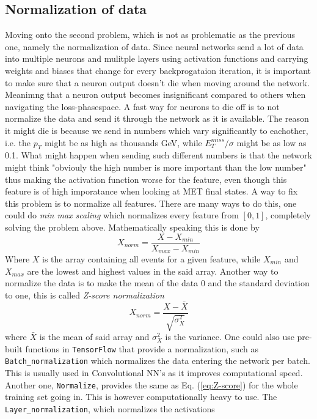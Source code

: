 \documentclass[12pt, a4paper]{book}
\begin{document}
\subsection{Normalization of data}\label{sec:normie_NN}
Moving onto the second problem, which is not as problematic as the previous one, namely the normalization of data. Since neural networks send a lot of data into multiple neurons and mulitple layers using activation functions and carrying weights and biases that change 
for every backprogataion iteration, it is important to make sure that a neuron output doesn't die when moving around the network. Meanimng that a neuron output becomes insignificant compared to others when navigating the loss-phasespace.
A fast way for neurons to die off is to not normalize the data and send it through the network as it is available. The reason it might die is because we send in numbers which vary significantly to eachother, i.e. the $p_{T}$ might be as high as thousands GeV, while 
$E_T^{miss}/\sigma$ might be as low as 0.1. What might happen when sending such different numbers is that the network might think "obviouly the high number is more important than the low number" thus making the activation function worse for the feature, even though 
this feature is of high imporatance when looking at MET final states. A way to fix this problem is to normalize all features. There are many ways to do this, one could do \textit{min max scaling} which normalizes every feature from $[0,1]$, completely solving the problem above. 
Mathematically speaking this is done by
\begin{equation}\label{eq:minmax}
   X_{norm} = \frac{X - X_{min}}{X_{max}-X_{min}}
\end{equation}
Where $X$ is the array containing all events for a given feature, while $X_{min}$ and $X_{max}$ are the lowest and highest values in the said array. Another way to normalize the data is to make the mean of the data 0 and the standard deviation to one, this is called \textit{Z-score normalization}
\begin{equation}\label{eq:Z-score}
   X_{norm} = \frac{X - \bar{X}}{\sqrt{\sigma_X^2}}
\end{equation}
where $\bar{X}$ is the mean of said array and $\sigma_X^2$ is the variance. One could also use pre-built functions in \verb|TensorFlow| that provide a normalization, such as \verb|Batch_normalization| which normalizes the data entering the network per batch. This is usually used 
in Convolutional NN's as it improves computational speed. Another one, \verb|Normalize|, provides the same as Eq. (\ref{eq:Z-score}) for the whole training set going in. This is however computationally heavy to use. The \verb|Layer_normalization|, which normalizes the activations 
\end{document}
